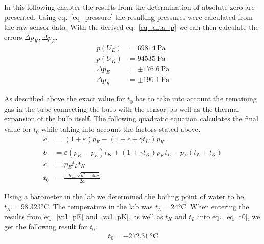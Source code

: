 
    In this following chapter the results from the determination of absolute zero are presented. %
    Using eq.~\ref{eq_pressure} the resulting pressures were calculated from the raw sensor data.
    With the derived eq.~\ref{eq_dlta_p} we can then calculate the errors $\Delta p_K, \Delta p_E$. %
    \begin{align}
        p(U_E) &= 69814 ~\si{\pascal}\\
        p(U_K) &= 94535 ~\si{\pascal}\\
        \Delta p_E &= \pm 176.6 ~\si{\pascal} \label{val_pE}\\
        \Delta p_K &= \pm 196.1 ~\si{\pascal} \label{val_pK}
    \end{align}

    As described above the exact value for $t_0$ has to take into account the remaining gas
    in the tube connecting the bulb with the sensor, as well as the thermal expansion of the
    bulb itself. The following quadratic equation calculates the final value for $t_0$ while
    taking into account the factors stated above.
    \begin{align}
        a &= (1 + \varepsilon)p_E - (1 + \epsilon + \gamma t_K)p_K\\
        b &= \varepsilon(p_K - p_E)t_K + (1 + \gamma t_K)p_K t_L - p_E(t_L + t_K)\\
        c &= p_E t_L t_K\\
        t_0 &= \frac{-b \pm \sqrt{b^2 - 4a c}}{2a} \label{eq_t0}
    \end{align}

    Using a barometer in the lab we determined the boiling point of water to be $t_K = 98.323 \si{\celsius}$.
    The temperature in the lab was $t_L = 24 \si{\celsius}$.
    When entering the results from eq.~\ref{val_pE} and~\ref{val_pK}, as well as $t_K$ and $t_L$ into eq.~\ref{eq_t0},
    we get the following result for $t_0$:
    \begin{align}
        t_0 = -272.31~\si{\celsius} \label{val_t0}
    \end{align}


